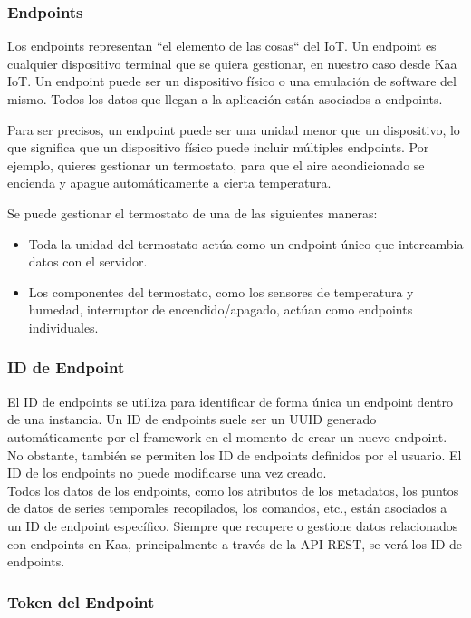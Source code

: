 {\subsubsection{Endpoints}

Los endpoints representan ``el elemento de las cosas`` del IoT. Un endpoint es cualquier dispositivo terminal que se quiera gestionar, en nuestro caso desde Kaa IoT. Un endpoint puede ser un dispositivo físico o una emulación de software del mismo. Todos los datos que llegan a la aplicación están asociados a endpoints. \cite{kaaiotConcepts}

Para ser precisos, un endpoint puede ser una unidad menor que un dispositivo, lo que significa que un dispositivo físico puede incluir múltiples endpoints. Por ejemplo, quieres gestionar un termostato, para que el aire acondicionado se encienda y apague automáticamente a cierta temperatura.

Se puede gestionar el termostato de una de las siguientes maneras:

\begin{itemize}
    \item Toda la unidad del termostato actúa como un endpoint único que intercambia datos con el servidor.
    \item Los componentes del termostato, como los sensores de temperatura y humedad, interruptor de encendido/apagado, actúan como endpoints individuales.
\end{itemize}

\subsubsection{ID de Endpoint}

El ID de endpoints se utiliza para identificar de forma única un endpoint dentro de una instancia. Un ID de endpoints suele ser un UUID generado automáticamente por el framework en el momento de crear un nuevo endpoint. No obstante, también se permiten los ID de endpoints definidos por el usuario. El ID de los endpoints no puede modificarse una vez creado. \\

Todos los datos de los endpoints, como los atributos de los metadatos, los puntos de datos de series temporales recopilados, los comandos, etc., están asociados a un ID de endpoint específico. Siempre que recupere o gestione datos relacionados con endpoints en Kaa, principalmente a través de la API REST, se verá los ID de endpoints.

\subsubsection{Token del Endpoint} \label{llamada-mqtt}

}
